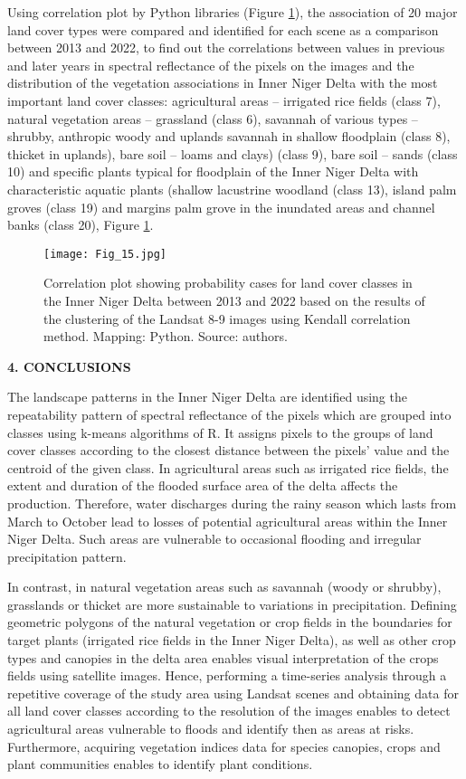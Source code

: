 \documentclass[12pt,a4paper,oneside]{article}
\def \newsection{\vspace{12pt}\textbf}
\def \newpar{\vspace{6pt}}
\begin{document}
\newpar Using correlation plot by Python libraries (Figure \ref{fig15}), the association of 20 major land cover types were compared and identified for each scene as a comparison between 2013 and 2022, to find out the correlations between values in previous and later years in spectral reflectance of the pixels on the images and the distribution of the vegetation associations in Inner Niger Delta with the most important land cover classes: agricultural areas -- irrigated rice fields (class 7), natural vegetation areas -- grassland (class 6), savannah of various types -- shrubby, anthropic woody and uplands savannah in shallow floodplain (class 8), thicket in uplands), bare soil -- loams and clays) (class 9), bare soil -- sands (class 10) and specific plants typical for floodplain of the Inner Niger Delta with characteristic aquatic plants (shallow lacustrine woodland (class 13), island palm groves (class 19) and margins palm grove in the inundated areas and channel banks (class 20), Figure \ref{fig15}.

\begin{figure}[H]
\centering
	\texttt{[image: Fig\_15.jpg]}
	\vspace*{20pt}\caption{Correlation plot showing probability cases for land cover classes in the Inner Niger Delta between 2013 and 2022 based on the results of the clustering of the Landsat 8-9 images using Kendall correlation method. Mapping: Python. Source: authors.
	\label{fig15}}
\end{figure}

\newsection {4. CONCLUSIONS}

\newpar The landscape patterns in the Inner Niger Delta are identified using the repeatability pattern of spectral reflectance of the pixels which are grouped into classes using k-means algorithms of R. It assigns pixels to the groups of land cover classes according to the closest distance between the pixels' value and the centroid of the given class. In agricultural areas such as irrigated rice fields, the extent and duration of the flooded surface area of the delta affects the production. Therefore, water discharges during the rainy season which lasts from March to October lead to losses of potential agricultural areas within the Inner Niger Delta. Such areas are vulnerable to occasional flooding and irregular precipitation pattern.

\newpar In contrast, in natural vegetation areas such as savannah (woody or shrubby), grasslands or thicket are more sustainable to variations in precipitation. Defining geometric polygons of the natural vegetation or crop fields in the boundaries for target plants (irrigated rice fields in the Inner Niger Delta), as well as other crop types and canopies in the delta area enables visual interpretation of the crops fields using satellite images. Hence, performing a time-series analysis through a repetitive coverage of the study area using Landsat scenes and obtaining data for all land cover classes according to the resolution of the images enables to detect agricultural areas vulnerable to floods and identify then as areas at risks. Furthermore, acquiring vegetation indices data for species canopies, crops and plant communities enables to identify plant conditions.
\end{document}
